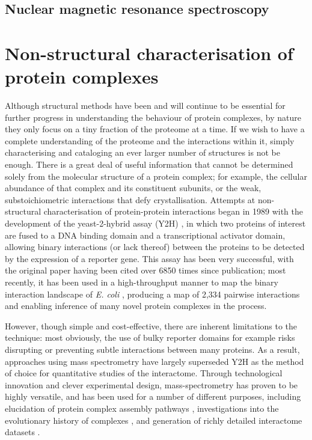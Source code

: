 \documentclass[a4paper,11pt,twoside,openright]{scrbook}
\begin{document}
\subsection{Nuclear magnetic resonance spectroscopy}


\section{Non-structural characterisation of protein complexes}
Although structural methods have been and will continue to be essential for further progress in understanding the behaviour of protein complexes, by nature they only focus on a tiny fraction of the proteome at a time. If we wish to have a complete understanding of the proteome and the interactions within it, simply characterising and cataloging an ever larger number of structures is not be enough. There is a great deal of useful information that cannot be determined solely from the molecular structure of a protein complex; for example, the cellular abundance of that complex and its constituent subunits, or the weak, substoichiometric interactions that defy crystallisation. Attempts at non-structural characterisation of protein-protein interactions began in 1989 with the development of the yeast-2-hybrid assay (Y2H) \cite{Fields1989}, in which two proteins of interest are fused to a DNA binding domain and a transcriptional activator domain, allowing binary interactions (or lack thereof) between the proteins to be detected by the expression of a reporter gene. This assay has been very successful, with the original paper having been cited over 6850 times since publication; most recently, it has been used in a high-throughput manner to map the binary interaction landscape of \textit{E. coli} \cite{Rajagopala2014}, producing a map of 2,334 pairwise interactions and enabling inference of many novel protein complexes in the process.

However, though simple and cost-effective, there are inherent limitations to the technique: most obviously, the use of bulky reporter domains for example risks disrupting or preventing subtle interactions between many proteins. As a result, approaches using mass spectrometry have largely superseded Y2H as the method of choice for quantitative studies of the interactome. Through technological innovation and clever experimental design, mass-spectrometry has proven to be highly versatile, and has been used for a number of different purposes, including elucidation of protein complex assembly pathways \cite{Levy2008a,Marsh2013}, investigations into the evolutionary history of complexes \cite{Wan2015}, and generation of richly detailed interactome datasets \cite{Hein2015}.
\end{document}
